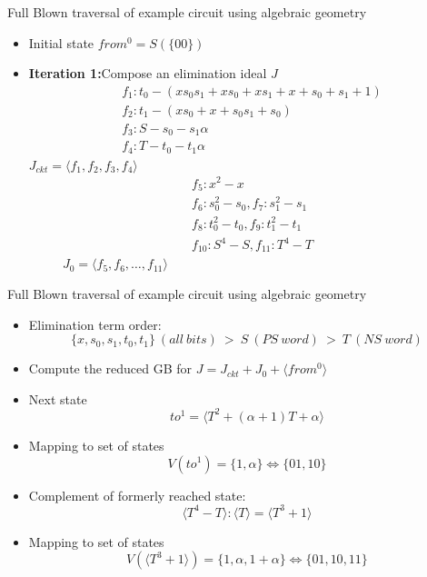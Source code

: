 \documentclass[xcolor=dvipsnames]{beamer}
\newcommand{\bi}{\begin{itemize}}
\newcommand{\ei}{\end{itemize}}
\begin{document}
\begin{frame}{\large{Full Blown traversal of example circuit using algebraic geometry}}
\bi
\item Initial state $from^0 = S(\{00\})$
\item {\bf Iteration 1:}Compose an elimination ideal $J$ 
\vspace{-0.2in}\\
\begin{align*}
&f_1: t_0- (xs_0s_1+xs_0+xs_1+x+s_0+s_1+1)\\
&f_2: t_1 - (xs_0+x+s_0s_1+s_0)\\
&f_3: S - s_0 - s_1\alpha\\
&f_4: T - t_0 - t_1\alpha
\end{align*}
$J_{ckt} = \langle f_1,f_2,f_3,f_4\rangle$
\begin{align*}
&f_5: x^2-x\\
&f_6: s_0^2-s_0, f_7: s_1^2-s_1\\
&f_8: t_0^2-t_0, f_9: t_1^2-t_1\\
&f_{10}: S^4-S, f_{11}:T^4-T
\end{align*}
$\ \ \ \ \ \ \ \ \ \ \  \ J_0 = \langle f_5,f_6,\dots,f_{11}\rangle$
\ei
\end{frame}
\begin{frame}[label = pptpage2]{\large{Full Blown traversal of example circuit using algebraic geometry}}
\bi
\item Elimination term order: 
$$\{x,s_0,s_1,t_0,t_1\}~(all~bits)~>~S~(PS~word)~ >~ T~(NS~word)$$
\item Compute the reduced GB for $J = J_{ckt}+J_0+\langle from^0\rangle$
\item Next state 
$$to^1 = \langle T^2+(\alpha+1)T+\alpha\rangle$$ 
\item Mapping to set of states
$$V(to^1) = \{1,\alpha\} \Leftrightarrow \{01,10\}$$
\item Complement of formerly reached state:
$$\langle T^4-T\rangle:\langle T\rangle = \langle T^3+1\rangle$$ 
\item Mapping to set of states
$$V(\langle T^3+1\rangle) = \{1,\alpha,1+\alpha\} \Leftrightarrow \{01,10,11\}$$
\ei
\hyperlink{linkSTG}{}
\end{frame}
\end{document}
